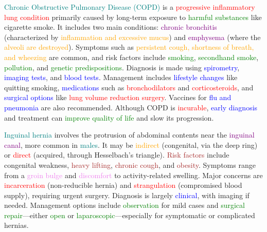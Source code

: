 \documentclass{article}
\begin{document}
\textcolor{teal}{Chronic Obstructive Pulmonary Disease (COPD)} is a \textcolor{red}{progressive inflammatory lung condition} primarily caused by long-term exposure to \textcolor{green}{harmful substances} like cigarette smoke. It includes two main conditions: \textcolor{purple}{chronic bronchitis} (characterized by \textcolor{orange}{inflammation and excessive mucus}) and \textcolor{purple}{emphysema} (where the \textcolor{orange}{alveoli are destroyed}). Symptoms such as \textcolor{orange}{persistent cough, shortness of breath, and wheezing} are common, and risk factors include \textcolor{green}{smoking}, \textcolor{green}{secondhand smoke}, \textcolor{green}{pollution}, and \textcolor{green}{genetic predispositions}. Diagnosis is made using \textcolor{blue}{spirometry}, \textcolor{blue}{imaging tests}, and \textcolor{blue}{blood tests}. Management includes \textcolor{blue}{lifestyle changes} like quitting smoking, \textcolor{blue}{medications} such as \textcolor{red}{bronchodilators} and \textcolor{red}{corticosteroids}, and \textcolor{blue}{surgical options} like \textcolor{red}{lung volume reduction surgery}. Vaccines for \textcolor{blue}{flu and pneumonia} are also recommended. Although COPD is \textcolor{red}{incurable}, \textcolor{blue}{early diagnosis} and treatment can \textcolor{green}{improve quality of life} and slow its progression.
\\
\bigskip


\textcolor{teal}{Inguinal hernia} involves the protrusion of abdominal contents near the \textcolor{purple}{inguinal canal}, more common in \textcolor{teal}{males}. It may be \textcolor{orange}{indirect} (congenital, via the deep ring) or \textcolor{red}{direct} (acquired, through Hesselbach’s triangle). \textcolor{brown}{Risk factors} include congenital weakness, \textcolor{brown}{heavy lifting}, \textcolor{brown}{chronic cough}, and \textcolor{brown}{obesity}. Symptoms range from a \textcolor{violet}{groin bulge} and \textcolor{violet}{discomfort} to activity-related swelling. Major concerns are \textcolor{red}{incarceration} (non-reducible hernia) and \textcolor{red}{strangulation} (compromised blood supply), requiring urgent surgery. Diagnosis is largely \textcolor{blue}{clinical}, with imaging if needed. Management options include \textcolor{green}{observation} for mild cases and \textcolor{green}{surgical repair}—either \textcolor{green}{open} or \textcolor{green}{laparoscopic}—especially for symptomatic or complicated hernias.

\\
\bigskip
\end{document}
